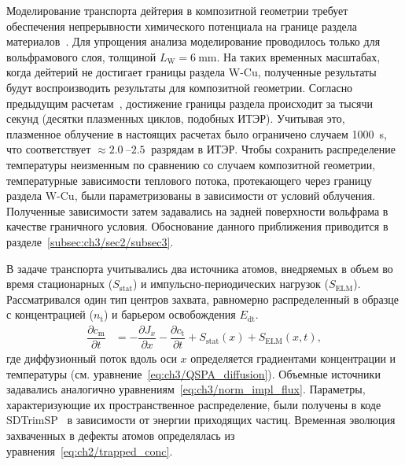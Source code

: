 Моделирование транспорта дейтерия в композитной геометрии требует обеспечения непрерывности химического потенциала на границе раздела материалов~\cite{Delaporte-Mathurin2021_3}. Для упрощения анализа моделирование проводилось только для вольфрамового слоя, толщиной \( L_\mathrm{W}=\SI{6}{\milli\meter} \). На таких временных масштабах, когда дейтерий не достигает границы раздела W-Cu, полученные результаты будут воспроизводить результаты для композитной геометрии. Согласно предыдущим расчетам~\cite{Delaporte-Mathurin2019, Delaporte-Mathurin2021_3}, достижение границы раздела происходит за тысячи секунд (десятки плазменных циклов, подобных ИТЭР). Учитывая это, плазменное облучение в настоящих расчетах было ограничено случаем \SI{1000}{\second}, что соответствует \( \approx \SIrange{2.0}{2.5}{} \) разрядам в ИТЭР. Чтобы сохранить распределение температуры неизменным по сравнению со случаем композитной геометрии, температурные зависимости теплового потока, протекающего через границу раздела W-Cu, были параметризованы в зависимости от условий облучения. Полученные зависимости затем задавались на задней поверхности вольфрама в качестве граничного условия. Обоснование данного приближения приводится в разделе~\cref{subsec:ch3/sec2/subsec3}.

В задаче транспорта учитывались два источника атомов, внедряемых в объем во время стационарных (\( S_\mathrm{stat} \)) и импульсно-периодических нагрузок (\( S_\mathrm{ELM} \)). Рассматривался один тип центров захвата, равномерно распределенный в образце с концентрацией (\( n_\mathrm{t} \)) и барьером освобождения \(E_\mathrm{dt} \).
\begin{subequations}
	\label{eq:ch3/diffusion_equation_ITER}
	\begin{align}
		\dfrac{\partial c_{\mathrm{m}}}{\partial t} & =-\dfrac{\partial J_x}{\partial x} - \dfrac{\partial c_{\mathrm{t}}}{\partial t} + S_{\mathrm{stat}}(x)+S_{\mathrm{ELM}}(x,t),
	\end{align}
\end{subequations}
где диффузионный поток вдоль оси \( x \) определяется градиентами концентрации и температуры (см. уравнение~\cref{eq:ch3/QSPA_diffusion}). Объемные источники задавались аналогично уравнениям~\cref{eq:ch3/norm_impl_flux}. Параметры, характеризующие их пространственное распределение, были получены в коде SDTrimSP~\cite{mutzke2024sdtrimsp} в зависимости от энергии приходящих частиц. Временная эволюция захваченных в дефекты атомов определялась из уравнения~\cref{eq:ch2/trapped_conc}. 

